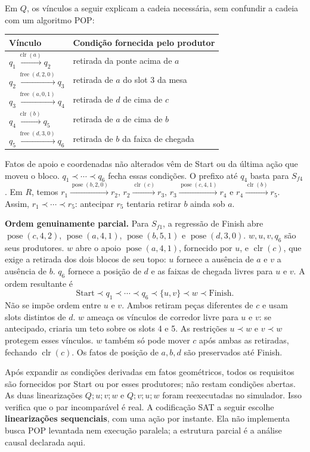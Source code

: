 \documentclass[11pt,a4paper]{article}
\newcommand{\clr}{\operatorname{clr}}
\newcommand{\pose}{\operatorname{pose}}
\newcommand{\free}{\operatorname{free}}
\begin{document}
Em $Q$, os vínculos a seguir explicam a cadeia necessária, sem confundir a cadeia com um algoritmo POP:
\begin{center}\small
\begin{tabular}{@{}ll@{}}\toprule Vínculo & Condição fornecida pelo produtor\\\midrule
$q_1\xrightarrow{\clr(a)}q_2$ & retirada da ponte acima de $a$\\
$q_2\xrightarrow{\free(d,2,0)}q_3$ & retirada de $a$ do slot 3 da mesa\\
$q_3\xrightarrow{\free(a,0,1)}q_4$ & retirada de $d$ de cima de $c$\\
$q_4\xrightarrow{\clr(b)}q_5$ & retirada de $a$ de cima de $b$\\
$q_5\xrightarrow{\free(d,3,0)}q_6$ & retirada de $b$ da faixa de chegada\\\bottomrule
\end{tabular}\end{center}
Fatos de apoio e coordenadas não alterados vêm de Start ou da última ação que moveu o bloco. $q_1\prec\cdots\prec q_6$ fecha essas condições. O prefixo até $q_4$ basta para $S_{f4}$. Em $R$, temos $r_1\xrightarrow{\pose(b,2,0)}r_2$, $r_2\xrightarrow{\clr(c)}r_3$, $r_3\xrightarrow{\pose(c,4,1)}r_4$ e $r_4\xrightarrow{\clr(b)}r_5$. Assim, $r_1\prec\cdots\prec r_5$: antecipar $r_5$ tentaria retirar $b$ ainda sob $a$.

\textbf{Ordem genuinamente parcial.} Para $S_{f1}$, a regressão de Finish abre $\pose(c,4,2)$, $\pose(a,4,1)$, $\pose(b,5,1)$ e $\pose(d,3,0)$. $w,u,v,q_6$ são seus produtores. $w$ abre o apoio $\pose(a,4,1)$, fornecido por $u$, e $\clr(c)$, que exige a retirada dos dois blocos de seu topo: $u$ fornece a ausência de $a$ e $v$ a ausência de $b$. $q_6$ fornece a posição de $d$ e as faixas de chegada livres para $u$ e $v$. A ordem resultante é
\[
\mathrm{Start}\prec q_1\prec\cdots\prec q_6
\prec\{u,v\}\prec w\prec\mathrm{Finish}.
\]
Não se impõe ordem entre $u$ e $v$. Ambos retiram peças diferentes de $c$ e usam slots distintos de $d$. $w$ ameaça os vínculos de corredor livre para $u$ e $v$: se antecipado, criaria um teto sobre os slots 4 e 5. As restrições $u\prec w$ e $v\prec w$ protegem esses vínculos. $w$ também só pode mover $c$ após ambas as retiradas, fechando $\clr(c)$. Os fatos de posição de $a,b,d$ são preservados até Finish.

Após expandir as condições derivadas em fatos geométricos, todos os requisitos são fornecidos por Start ou por esses produtores; não restam condições abertas. As duas linearizações $Q;u;v;w$ e $Q;v;u;w$ foram reexecutadas no simulador. Isso verifica que o par incomparável é real. A codificação SAT a seguir escolhe \textbf{linearizações sequenciais}, com uma ação por instante. Ela não implementa busca POP levantada nem execução paralela; a estrutura parcial é a análise causal declarada aqui.
\end{document}
